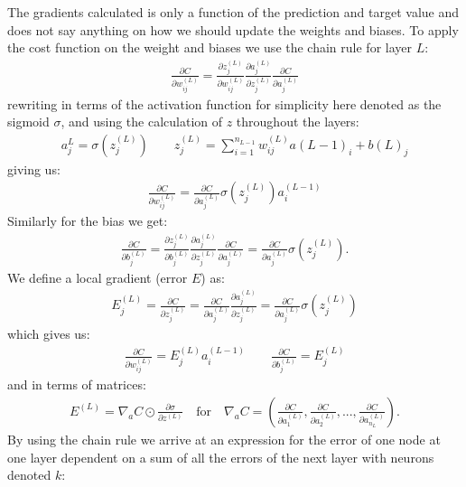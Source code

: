 \documentclass[11pt]{article}
\begin{document}
The gradients calculated is only a function of the prediction and target value and does not say anything on how we should update the weights and biases. To apply the cost function on the weight and biases we use the chain rule for layer $L$:
\begin{align*}
    \frac{\partial C}{\partial w^{(L)}_{ij}}  = \frac{\partial z^{(L)}_j}{\partial w^{(L)}_{ij}}  \frac{\partial a^{(L)}_{j}}{\partial z^{(L)}_j}  \frac{\partial C}{\partial a^{(L)}_j}
\end{align*}
rewriting in terms of the activation function for simplicity here denoted as the sigmoid $\sigma$, and using the calculation of $z$ throughout the layers:
\begin{align*}
    a_j^L = \sigma(z_j^{(L)}) \quad\quad z_j^{(L)} = \sum_{i=1}^{n_{L-1}}w^{(L)}_{ij}a{(L-1)}_{i} + b{(L)}_{j}
\end{align*}
giving us:
\begin{align*}
    \frac{\partial C}{\partial w^{(L)}_{ij}} = \frac{\partial C}{\partial a^{(L)}_{j}}\sigma(z_j^{(L)})a_i^{(L-1)}
\end{align*}
Similarly for the bias we get:
\begin{align*}
    \frac{\partial C}{\partial b^{(L)}_{j}} = \frac{\partial z^{(L)}_j}{\partial b^{(L)}_{j}}  \frac{\partial a^{(L)}_{j}}{\partial z^{(L)}_j}  \frac{\partial C}{\partial a^{(L)}_j} =
    \frac{\partial C}{\partial a^{(L)}_{j}}\sigma(z_j^{(L)}).
\end{align*}
We define a local gradient (error $E$) as:
\begin{align*}
    E_j^{(L)} = \frac{\partial C }{\partial z_j^{(L)}} = \frac{\partial C }{\partial a_j^{(L)}}\frac{\partial a_j^{(L)} }{\partial z_j^{(L)}} = \frac{\partial C }{\partial a_j^{(L)}} \sigma(z_j^{(L)})
\end{align*}
which gives us:
\begin{align*}
    \frac{\partial C }{\partial w_{ij}^{(L)}} = E_j^{(L)} a_i^{(L-1)} \quad\quad
    \frac{\partial C }{\partial b_{j}^{(L)}} = E_j^{(L)}
\end{align*}
and in terms of matrices:
\begin{align*}
    E^{(L)} = \nabla_a C \odot \frac{\partial \sigma }{\partial z^{(L)}} \quad \text{for} \quad \nabla_a C = \left(\frac{\partial C }{\partial a_1^{(L)}}, \frac{\partial C }{\partial a_2^{(L)}},..., \frac{\partial C }{\partial a_{n_L}^{(L)}}\right).
\end{align*}
By using the chain rule we arrive at an expression for the error of one node at one layer dependent on a sum of all the errors of the next layer with neurons denoted $k$:
\end{document}
